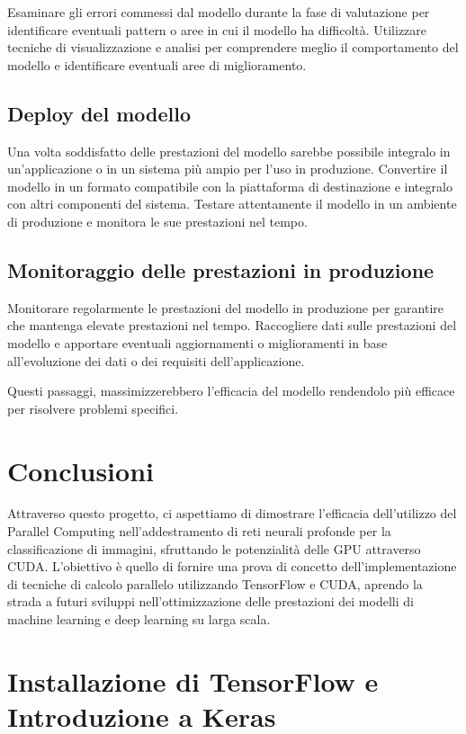 \documentclass{article}
\begin{document}
Esaminare gli errori commessi dal modello durante la fase di valutazione per identificare eventuali pattern o aree in cui il modello ha difficoltà. Utilizzare tecniche di visualizzazione e analisi per comprendere meglio il comportamento del modello e identificare eventuali aree di miglioramento.

\subsection{Deploy del modello}

Una volta soddisfatto delle prestazioni del modello sarebbe possibile integralo in un'applicazione o in un sistema più ampio per l'uso in produzione. Convertire il modello in un formato compatibile con la piattaforma di destinazione e integralo con altri componenti del sistema. Testare attentamente il modello in un ambiente di produzione e monitora le sue prestazioni nel tempo.

\subsection{Monitoraggio delle prestazioni in produzione}

Monitorare regolarmente le prestazioni del modello in produzione per garantire che mantenga elevate prestazioni nel tempo. Raccogliere dati sulle prestazioni del modello e apportare eventuali aggiornamenti o miglioramenti in base all'evoluzione dei dati o dei requisiti dell'applicazione.

Questi passaggi, massimizzerebbero l'efficacia del modello rendendolo più efficace per risolvere problemi specifici.


\section{Conclusioni}
Attraverso questo progetto, ci aspettiamo di dimostrare l'efficacia dell'utilizzo del Parallel Computing nell'addestramento di reti neurali profonde per la classificazione di immagini, sfruttando le potenzialità delle GPU attraverso CUDA. L'obiettivo è quello di fornire una prova di concetto dell'implementazione di tecniche di calcolo parallelo utilizzando TensorFlow e CUDA, aprendo la strada a futuri sviluppi nell'ottimizzazione delle prestazioni dei modelli di machine learning e deep learning su larga scala.
\newpage
\appendix
\section{Installazione di TensorFlow e Introduzione a Keras}
\end{document}
